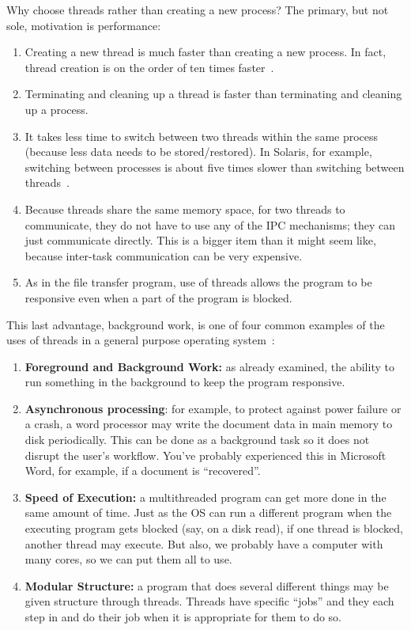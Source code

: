 Why choose threads rather than creating a new process? The primary, but not sole, motivation is performance:
\begin{enumerate}
	\item Creating a new thread is much faster than creating a new process. In fact, thread creation is on the order of ten times faster~\cite{machThreads}.
	\item Terminating and cleaning up a thread is faster than terminating and cleaning up a process.
	\item It takes less time to switch between two threads within the same process (because less data needs to be stored/restored). In Solaris, for example, switching between processes is about five times slower than switching between threads~\cite{osc}.
	\item Because threads share the same memory space, for two threads to communicate, they do not have to use any of the IPC mechanisms; they can just communicate directly. This is a bigger item than it might seem like, because inter-task communication can be very expensive.
	\item As in the file transfer program, use of threads allows the program to be responsive even when a part of the program is blocked.
\end{enumerate}

This last advantage, background work, is one of four common examples of the uses of threads in a general purpose operating system~\cite{insideOS2}:
\begin{enumerate}
	\item \textbf{Foreground and Background Work:} as already examined, the ability to run something in the background to keep the program responsive.
	\item \textbf{Asynchronous processing}: for example, to protect against power failure or a crash, a word processor may write the document data in main memory to disk periodically. This can be done as a background task so it does not disrupt the user's workflow. You've probably experienced this in Microsoft Word, for example, if a document is ``recovered''.
	\item \textbf{Speed of Execution:} a multithreaded program can get more done in the same amount of time. Just as the OS can run a different program when the executing program gets blocked (say, on a disk read), if one thread is blocked, another thread may execute. But also, we probably have a computer with many cores, so we can put them all to use.
	\item \textbf{Modular Structure:} a program that does several different things may be given structure through threads. Threads have specific ``jobs'' and they each step in and do their job when it is appropriate for them to do so.
\end{enumerate}

